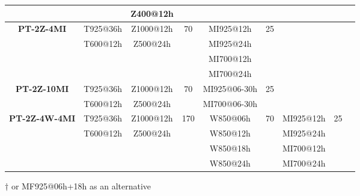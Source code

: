 \documentclass[review]{elsarticle}
\begin{document}
\begin{table*}[t]
\begin{center}
\begin{tabular}{ccccccccl}
			&& Z400@12h &&&&&& \\
			\hline 
			\textbf{PT-2Z-4MI} & T925@36h & Z1000@12h & 70 & MI925@12h & 25 &&& \citealt{BenDaoud2016} \\
			& T600@12h & Z500@24h && MI925@24h &&&& \\
			&&&& MI700@12h &&&& \\
			&&&& MI700@24h &&&& \\
			\hline 
			\textbf{PT-2Z-10MI} & T925@36h & Z1000@12h & 70 & MI925@06-30h & 25 &&& \citealt{BenDaoud2010} \\
			& T600@12h & Z500@24h && MI700@06-30h &&&& \\
			\hline 
			\textbf{PT-2Z-4W-4MI} & T925@36h & Z1000@12h & 170 & W850@06h & 70 & MI925@12h & 25 & \citealt{BenDaoud2016} \\
			& T600@12h & Z500@24h && W850@12h && MI925@24h && \\
			&&&& W850@18h && MI700@12h && \\
			&&&& W850@24h && MI700@24h && \\
			\hline 
		\end{tabular} 
	\end{center}

	$\dagger$ or MF925@06h+18h as an alternative
	\label{table:methods}
\end{table*}
\end{document}
